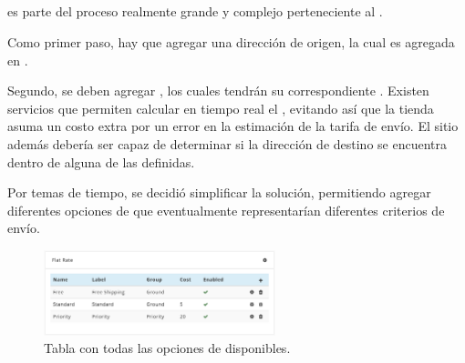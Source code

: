 \subsection{\shippingEF}\label{cap:solucionImplementada:section:dashboard:subsection:shipping}

\shippingEF es parte del proceso realmente grande y complejo perteneciente al \workflowCPT \orderFulfillmentCOM. 

Como primer paso, hay que agregar una dirección de origen, la cual es agregada en .

Segundo, se deben agregar \shippingZonesCOM, los cuales tendrán su correspondiente \shippingRatesCOM. Existen servicios que permiten calcular en tiempo real el \shippingRatesCOM, evitando así que la tienda asuma un costo extra por un error en la estimación de la tarifa de envío. El sitio además debería ser capaz de determinar si la dirección de destino se encuentra dentro de alguna de las \shippingZonesCOM definidas.


Por temas de tiempo, se decidió simplificar la solución, permitiendo agregar diferentes opciones de \shippingEF que eventualmente representarían diferentes criterios de envío.


\begin{figure}[H]
	\centering
	\includegraphics[width=0.6\textwidth]{figuras/dashboard/shipping/shipping_options.png}
	\caption{Tabla con todas las opciones de \shippingEF disponibles.}
	\label{figure:dashboard:shipping:shipping_options}
\end{figure}


